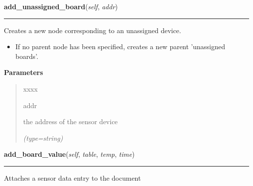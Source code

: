     \label{XMLGenerator:XMLGenerator:add_unassigned_board}

    \vspace{0.5ex}

\hspace{.8\funcindent}\begin{boxedminipage}{\funcwidth}

    \raggedright \textbf{add\_unassigned\_board}(\textit{self}, \textit{addr})

    \vspace{-1.5ex}

    \rule{\textwidth}{0.5\fboxrule}
\setlength{\parskip}{2ex}
    Creates a new node corresponding to an unassigned device.

    \begin{itemize}
    \setlength{\parskip}{0.6ex}
      \item If no parent node has been specified, creates a new parent 
        'unassigned boards'.

    \end{itemize}

\setlength{\parskip}{1ex}
      \textbf{Parameters}
      \vspace{-1ex}

      \begin{quote}
        \begin{Ventry}{xxxx}

          \item[addr]

          the address of the sensor device

            {\it (type=string)}

        \end{Ventry}

      \end{quote}

    \end{boxedminipage}

    \label{XMLGenerator:XMLGenerator:add_board_value}

    \vspace{0.5ex}

\hspace{.8\funcindent}\begin{boxedminipage}{\funcwidth}

    \raggedright \textbf{add\_board\_value}(\textit{self}, \textit{table}, \textit{temp}, \textit{time})

    \vspace{-1.5ex}

    \rule{\textwidth}{0.5\fboxrule}
\setlength{\parskip}{2ex}
    Attaches a sensor data entry to the document

\setlength{\parskip}{1ex}
    \end{boxedminipage}

